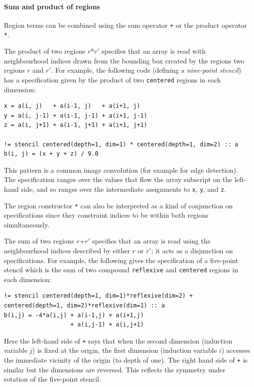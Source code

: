 \documentclass[9pt]{sigplanconf}
\theoremstyle{definition}
\newcommand{\term}[1]{\texttt{#1}}
\begin{document}
\paragraph{Sum and product of regions}
Region terms can be combined using the sum operator
\term{+} or the product operator \term{*}.

The product of two regions $r \texttt{*} r'$ specifies that an array
is read with neighbourhood indices drawn from the bounding box created
by the regions two regions $r$ and $r'$. For example, the following
code (defining a \emph{nine-point stencil}) has a specification given by the
product of two \texttt{centered} regions in each dimension:
\begin{verbatim}
x = a(i, j)   + a(i-1, j)   + a(i+1, j)
y = a(i, j-1) + a(i-1, j-1) + a(i+1, j-1)
z = a(i, j+1) + a(i-1, j+1) + a(i+1, j+1)

!= stencil centered(depth=1, dim=1) * centered(depth=1, dim=2) :: a
b(i, j) = (x + y + z) / 9.0
\end{verbatim}
This pattern is a common image convolution (for example
for edge detection). The specification ranges over the
values that flow the array subscript on the left-hand side,
and so ranges over the intermediate assignments to \term{x},
\term{y}, and \term{z}.

The region constructor \texttt{*} can also be interpreted as a
kind of conjunction on specifications since they constraint
indices to be within both regions simultaneously.

The sum of two regions $r \texttt{+} r'$ specifies that an array is
read using the neighbourhood indices described by either $r$ or
$r'$; it acts as a disjunction on specifications. For
example, the following gives the specification of a five-point
stencil which is the sum of two compound \texttt{reflexive} and
\texttt{centered} regions in each dimension:
\begin{verbatim}
!= stencil centered(depth=1, dim=1)*reflexive(dim=2) + centered(depth=1, dim=2)*reflexive(dim=1) :: a
b(i,j) = -4*a(i,j) + a(i-1,j) + a(i+1,j)
                   + a(i,j-1) + a(i,j+1)
\end{verbatim}
Here the left-hand side of \texttt{+} says that when the second dimension
(induction variable $j$) is fixed at the origin, the first dimension
(induction variable $i$) accesses the immediate vicinity of the origin
(to depth of one). The right hand side of \texttt{+} is similar but the dimensions are reversed.
This reflects the symmetry under rotation of the five-point stencil.
\end{document}
